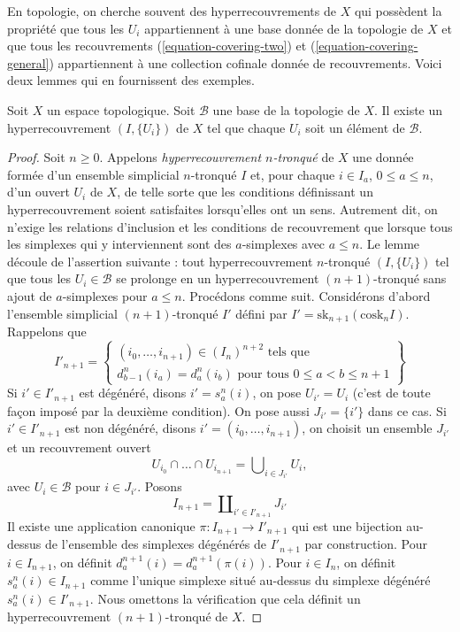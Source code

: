 \noindent
En topologie, on cherche souvent des hyperrecouvrements de $X$ qui
possèdent la propriété que tous les $U_i$ appartiennent à une base donnée de la topologie
de $X$ et que tous les recouvrements
(\ref{equation-covering-two}) et (\ref{equation-covering-general})
appartiennent à une collection cofinale donnée de recouvrements.
Voici deux lemmes qui en fournissent des exemples.

\begin{lemma}
\label{lemma-basis-hypercovering}
Soit $X$ un espace topologique.
Soit $\mathcal{B}$ une base de la topologie de $X$.
Il existe un hyperrecouvrement $(I, \{U_i\})$ de $X$
tel que chaque $U_i$ soit un élément de $\mathcal{B}$.
\end{lemma}

\begin{proof}
Soit $n \geq 0$.
Appelons {\it hyperrecouvrement $n$-tronqué} de $X$ une donnée
formée d'un ensemble simplicial $n$-tronqué $I$ et, pour chaque
$i \in I_a$, $0 \leq a \leq n$, d'un ouvert $U_i$ de $X$, de telle sorte que
les conditions définissant un hyperrecouvrement soient satisfaites lorsqu'elles ont un sens.
Autrement dit, on n'exige les relations d'inclusion et les conditions de
recouvrement que lorsque tous les simplexes qui y interviennent
sont des $a$-simplexes avec $a \leq n$. Le lemme découle de l'assertion
suivante : tout hyperrecouvrement $n$-tronqué $(I, \{U_i\})$ tel que
tous les $U_i \in \mathcal{B}$ se prolonge en un hyperrecouvrement $(n + 1)$-tronqué
sans ajout de $a$-simplexes pour $a \leq n$.
Procédons comme suit. Considérons d'abord l'ensemble simplicial
$(n + 1)$-tronqué $I'$ défini par
$I' = \text{sk}_{n + 1}(\text{cosk}_n I)$.
Rappelons que
$$
I'_{n + 1} =
\left\{
\begin{matrix}
(i_0, \ldots, i_{n + 1}) \in (I_n)^{n + 2} \text{ tels que}\\
d^n_{b - 1}(i_a) = d^n_a(i_b) \text{ pour tous }0\leq a < b\leq n + 1
\end{matrix}
\right\}
$$
Si $i' \in I'_{n + 1}$ est dégénéré, disons $i' = s^n_a(i)$, on pose
$U_{i'} = U_i$ (c'est de toute façon imposé par la deuxième condition).
On pose aussi $J_{i'} = \{i'\}$ dans ce cas.
Si $i' \in I'_{n + 1}$ est non dégénéré, disons
$i' = (i_0, \ldots, i_{n + 1})$, on choisit un ensemble
$J_{i'}$ et un recouvrement ouvert
\begin{equation}
\label{equation-choose-covering}
U_{i_0} \cap \ldots \cap U_{i_{n + 1}} =
\bigcup\nolimits_{i \in J_{i'}} U_i,
\end{equation}
avec $U_i \in \mathcal{B}$ pour $i \in J_{i'}$.
Posons
$$
I_{n + 1} = \coprod\nolimits_{i' \in I'_{n + 1}} J_{i'}
$$
Il existe une application canonique $\pi : I_{n + 1} \to I'_{n + 1}$ qui est
une bijection au-dessus de l'ensemble des simplexes dégénérés de $I'_{n + 1}$ par
construction.
Pour $i \in I_{n + 1}$, on définit $d^{n + 1}_a(i) = d^{n + 1}_a(\pi(i))$.
Pour $i \in I_n$, on définit $s^n_a(i) \in I_{n + 1}$ comme l'unique
simplexe situé au-dessus du simplexe dégénéré $s^n_a(i) \in I'_{n + 1}$.
Nous omettons la vérification que cela définit un hyperrecouvrement
$(n + 1)$-tronqué de $X$.
\end{proof}

